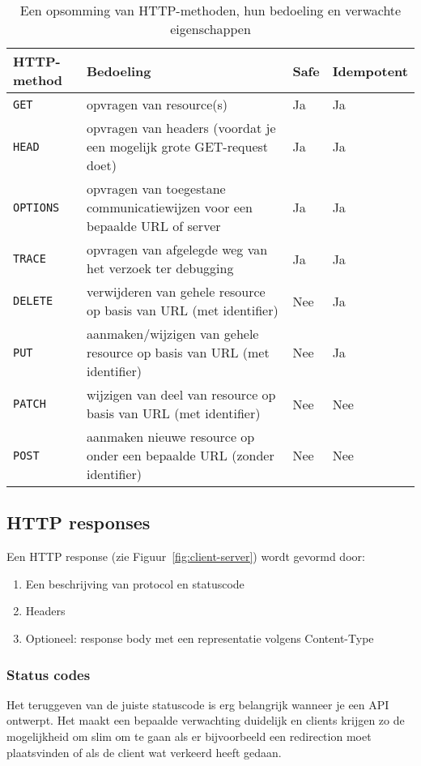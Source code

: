 \begin{table}[H]
\centering
\begin{tabularx}{\textwidth}{|>{\raggedright}l|>{\raggedright}l|>{\raggedright\arraybackslash}X|}
\hline
\textbf{HTTP-method} & \textbf{Bedoeling} & \textbf{Safe} & \textbf{Idempotent} \\ \hline
\texttt{GET} & opvragen van resource(s) & Ja & Ja \\ \hline
\texttt{HEAD} & opvragen van headers (voordat je een mogelijk grote GET-request doet) & Ja & Ja \\ \hline
\texttt{OPTIONS} & opvragen van toegestane communicatiewijzen voor een bepaalde URL of server & Ja & Ja \\ \hline
\texttt{TRACE} & opvragen van afgelegde weg van het verzoek ter debugging & Ja & Ja \\ \hline
\texttt{DELETE} & verwijderen van gehele resource op basis van URL (met identifier) & Nee & Ja \\ \hline
\texttt{PUT} & aanmaken/wijzigen van gehele resource op basis van URL (met identifier) & Nee & Ja \\ \hline
\texttt{PATCH} & wijzigen van deel van resource op basis van URL (met identifier) & Nee & Nee \\ \hline
\texttt{POST} & aanmaken nieuwe resource op onder een bepaalde URL (zonder identifier) & Nee & Nee \\ \hline
\end{tabularx}
\caption{Een opsomming van HTTP-methoden, hun bedoeling en verwachte eigenschappen}
\label{table:http-methods}
\centering
\end{table}

\subsection{HTTP responses}
Een HTTP response (zie Figuur~\ref{fig:client-server}) wordt gevormd door:
\begin{enumerate}
    \item Een beschrijving van protocol en statuscode
    \item Headers
    \item Optioneel: response body met een representatie volgens Content-Type 
\end{enumerate}

\subsubsection{Status codes}
Het teruggeven van de juiste statuscode is erg belangrijk wanneer je een API 
ontwerpt. Het maakt een bepaalde verwachting duidelijk en clients krijgen zo 
de mogelijkheid om slim om te gaan als er bijvoorbeeld een redirection moet plaatsvinden
of als de client wat verkeerd heeft gedaan.

